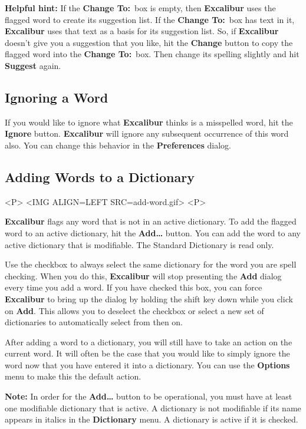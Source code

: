 ﻿\documentclass[11pt,titlepage]{article}
\newcommand{\ex}{\textbf{Excalibur}}
\begin{document}
\textbf{Helpful hint:} If the \textbf{Change To:}\ box is empty, then
\ex{} uses the flagged word to create its suggestion list. If the
\textbf{Change To:}\ box has text in it, \ex{} uses that text as a
basis for its suggestion list. So, if \ex{} doesn't give you a
suggestion that you like, hit the \textbf{Change} button to copy the
flagged word into the \textbf{Change To:}\ box. Then change its
spelling slightly and hit \textbf{Suggest} again.

\subsection{Ignoring a Word}

If you would like to ignore what \ex{} thinks is a misspelled word,
hit the \textbf{Ignore} button. \ex{} will ignore any subsequent
occurrence of this word also. You can change this behavior in the
\textbf{Preferences} dialog.

\subsection{Adding Words to a Dictionary}

\begin{rawhtml}
<P>
<IMG ALIGN=LEFT SRC=add-word.gif>
<P>
\end{rawhtml}

\ex{} flags any word that is not in an active dictionary. To add the
flagged word to an active dictionary, hit the \textbf{Add\ldots}
button.  You can add the word to any active dictionary that is
modifiable.  The Standard Dictionary is read only.

Use the checkbox to always select the same dictionary for the word you
are spell checking. When you do this, \ex{} will stop presenting the
\textbf{Add} dialog every time you add a word. If you have checked
this box, you can force \ex{} to bring up the dialog by holding the
shift key down while you click on \textbf{Add}. This allows you to
deselect the checkbox or select a new set of dictionaries to
automatically select from then on.

After adding a word to a dictionary, you will still have to take an
action on the current word. It will often be the case that you would
like to simply ignore the word now that you have entered it into a
dictionary. You can use the \textbf{Options} menu to make this the
default action.

\textbf{Note:} In order for the \textbf{Add\ldots} button to be
operational, you must have at least one modifiable dictionary that is
active.  A dictionary is not modifiable if its name appears in italics
in the \textbf{Dictionary} menu.  A dictionary is active if it is
checked.
\end{document}
